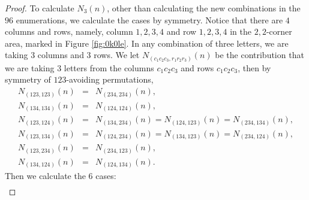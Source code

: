 \documentclass[
final,nomarks
]{dmtcs-episciences}
\newcommand{\fref}[1]{Figure \ref{fig:#1}}
\begin{document}
\begin{proof}
	To calculate \begin{math}N_3(n)\end{math}, other than calculating the new combinations in the \begin{math}96\end{math} enumerations, we calculate the cases by symmetry. Notice that there are \begin{math}4\end{math} columns and rows, namely, column \begin{math}1,2,3,4\end{math} and row \begin{math}1,2,3,4\end{math} in the \begin{math}2,2\end{math}-corner area, marked in \fref{0k0le}. In any combination of three letters, we are taking \begin{math}3\end{math} columns and \begin{math}3\end{math} rows. We let \begin{math}N_{(c_1c_2c_3,r_1r_2r_3)}(n)\end{math} be the contribution that we are taking \begin{math}3\end{math} letters from the columns \begin{math}c_1c_2c_3\end{math} and rows \begin{math}c_1c_2c_3\end{math}, then by symmetry of \begin{math}123\end{math}-avoiding permutations,
	\begin{eqnarray}
		N_{(123,123)}(n)&=&N_{(234,234)}(n),\\
		N_{(134,134)}(n)&=&N_{(124,124)}(n),\\
		N_{(123,124)}(n)&=&N_{(134,234)}(n)=N_{(124,123)}(n)=N_{(234,134)}(n),\\
		N_{(123,134)}(n)&=&N_{(124,234)}(n)=N_{(134,123)}(n)=N_{(234,124)}(n),\\
		N_{(123,234)}(n)&=&N_{(234,123)}(n),\\
		N_{(134,124)}(n)&=&N_{(124,134)}(n).
	\end{eqnarray}
	Then we calculate the \begin{math}6\end{math} cases:
	\begin{eqnarray}

\end{eqnarray}
\end{proof}
\end{document}
